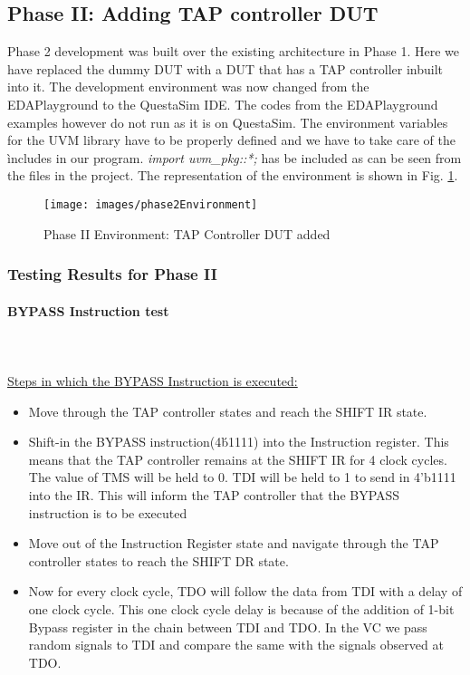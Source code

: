 \documentclass[a4paper,11pt]{article}
\begin{document}
\subsection{Phase II: Adding TAP controller DUT}

Phase 2 development was built over the existing architecture in Phase 1. Here we have replaced the dummy DUT with a DUT that has a TAP controller inbuilt into it. The development environment was now changed from the EDAPlayground to the QuestaSim IDE. The codes from the EDAPlayground examples however do not run as it is on QuestaSim. The environment variables for the UVM library have to be properly defined and we have to take care of the \`includes in our program. \textit{import uvm\_pkg::*;} has be included as can be seen from the files in the project. The representation of the environment is shown in Fig. \ref{fig: Phase II Environment}.

\begin{figure}[ht]
\centering
\texttt{[image: images/phase2Environment]}
\caption{Phase II Environment: TAP Controller DUT added}
\label{fig: Phase II Environment}
\end{figure}
\FloatBarrier
\subsubsection{Testing Results for Phase II}

\paragraph{BYPASS Instruction test}\mbox{}\\
 \\\underline{Steps in which the BYPASS Instruction is executed:}
\begin{itemize}[noitemsep]
\item Move through the TAP controller states and reach the SHIFT IR state.
\item Shift-in the BYPASS instruction(4\'b1111) into the Instruction register. This means that the TAP controller remains at the SHIFT IR for 4 clock cycles. The value of TMS will be held to 0. TDI will be held to 1 to send in 4'b1111 into the IR. This will inform the TAP controller that the BYPASS instruction is to be executed
\item Move out of the Instruction Register state and navigate through the TAP controller states to reach the SHIFT DR state.
\item Now for every clock cycle, TDO will follow the data from TDI with a delay of one clock cycle. This one clock cycle delay is because of the addition of 1-bit Bypass register in the chain between TDI and TDO. In the VC we pass random signals to TDI and compare the same with the signals observed at TDO.
\end{itemize}
\end{document}
